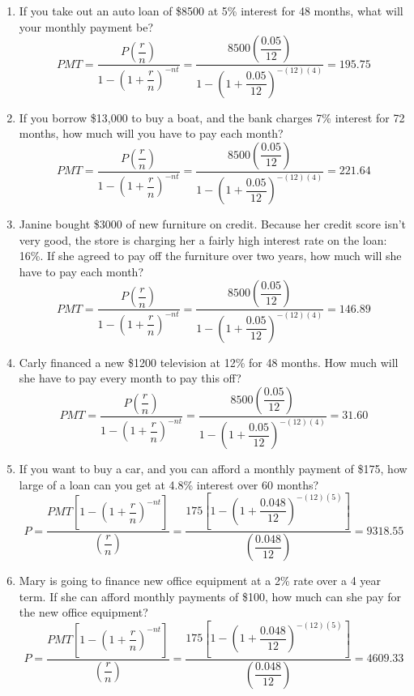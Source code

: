 \begin{enumerate}
\item If you take out an auto loan of \$8500 at 5\% interest for 48 months, what will your monthly payment be? 
\[PMT = \dfrac{P\left(\dfrac{r}{n}\right)}{1-\left(1+\dfrac{r}{n}\right)^{-nt}} = \dfrac{8500\left(\dfrac{0.05}{12}\right)}{1-\left(1+\dfrac{0.05}{12}\right)^{-(12)(4)}} = 195.75\]

\item If you borrow \$13,000 to buy a boat, and the bank charges 7\% interest for 72 months, how much will you have to pay each month? 
\[PMT = \dfrac{P\left(\dfrac{r}{n}\right)}{1-\left(1+\dfrac{r}{n}\right)^{-nt}} = \dfrac{8500\left(\dfrac{0.05}{12}\right)}{1-\left(1+\dfrac{0.05}{12}\right)^{-(12)(4)}} = 221.64\]

\item Janine bought \$3000 of new furniture on credit.  Because her credit score isn't very good, the store is charging her a fairly high interest rate on the loan: 16\%.  If she agreed to pay off the furniture over two years, how much will she have to pay each month? 
\[PMT = \dfrac{P\left(\dfrac{r}{n}\right)}{1-\left(1+\dfrac{r}{n}\right)^{-nt}} = \dfrac{8500\left(\dfrac{0.05}{12}\right)}{1-\left(1+\dfrac{0.05}{12}\right)^{-(12)(4)}} = 146.89\]

\item Carly financed a new \$1200 television at 12\% for 48 months.  How much will she have to pay every month to pay this off? 
\[PMT = \dfrac{P\left(\dfrac{r}{n}\right)}{1-\left(1+\dfrac{r}{n}\right)^{-nt}} = \dfrac{8500\left(\dfrac{0.05}{12}\right)}{1-\left(1+\dfrac{0.05}{12}\right)^{-(12)(4)}} = 31.60\]

\item If you want to buy a car, and you can afford a monthly payment of \$175, how large of a loan can you get at 4.8\% interest over 60 months? 
\[P = \dfrac{PMT\left[1-\left(1+\dfrac{r}{n}\right)^{-nt}\right]}{\left(\dfrac{r}{n}\right)} = \dfrac{175\left[1-\left(1+\dfrac{0.048}{12}\right)^{-(12)(5)}\right]}{\left(\dfrac{0.048}{12}\right)} = 9318.55\]

\item Mary is going to finance new office equipment at a 2\% rate over a 4 year term.  If she can afford monthly payments of \$100, how much can she pay for the new office equipment? 
\[P = \dfrac{PMT\left[1-\left(1+\dfrac{r}{n}\right)^{-nt}\right]}{\left(\dfrac{r}{n}\right)} = \dfrac{175\left[1-\left(1+\dfrac{0.048}{12}\right)^{-(12)(5)}\right]}{\left(\dfrac{0.048}{12}\right)} = 4609.33\]


\end{enumerate}
